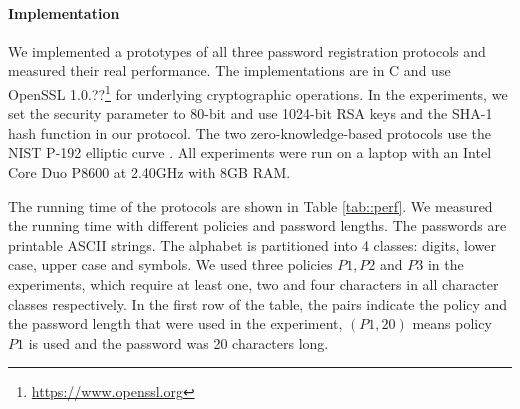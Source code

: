 \paragraph{Implementation}
We implemented a prototypes of all three password registration protocols and measured their real performance. 
The implementations are in C and use OpenSSL 1.0.??\footnote{\url{https://www.openssl.org}} for underlying cryptographic operations. 
In the experiments, we set the security parameter to 80-bit and use 1024-bit RSA keys and the \mbox{{SHA-}1} hash function in our protocol. 
The two zero-knowledge-based protocols use the \ac{NIST} P-192 elliptic curve \cite{nistEC}.
All experiments were run on a laptop with an Intel Core Duo P8600 at 2.40GHz with 8GB RAM.

\begin{table}[!t]
\begin{center}
\caption{Protocol Performance (Running Time in Milliseconds)} \label{tab::perf}
\end{center}
\end{table} 

The running time of the protocols are shown in Table \ref{tab::perf}. We measured the running time with different policies and password lengths. The passwords are printable \ac{ASCII} strings. 
The alphabet is partitioned into 4 classes: digits, lower case, upper case and symbols. 
We used three policies $P1, P2$ and $P3$ in the experiments, which require at least one, two and four characters in all character classes respectively. 
In the first row of the table, the pairs indicate the policy and the password length that were used in the experiment, \eg $(P1, 20)$ means policy $P1$ is used and the password was 20 characters long. 

